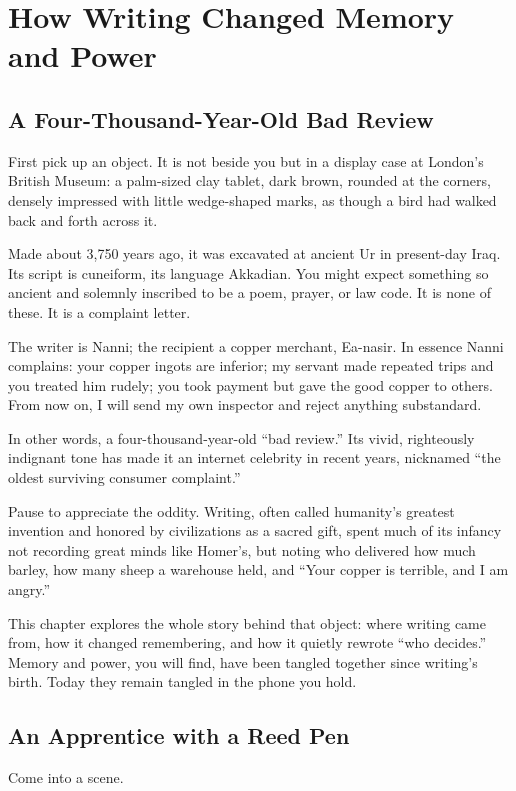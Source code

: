 \chapter[Writing, Memory, and Power]{How Writing Changed Memory and Power}
\section{A Four-Thousand-Year-Old Bad Review}
First pick up an object. It is not beside you but in a display case at London's British Museum: a palm-sized clay tablet, dark brown, rounded at the corners, densely impressed with little wedge-shaped marks, as though a bird had walked back and forth across it.

Made about 3,750 years ago, it was excavated at ancient Ur in present-day Iraq. Its script is cuneiform, its language Akkadian. You might expect something so ancient and solemnly inscribed to be a poem, prayer, or law code. It is none of these. It is a complaint letter.

The writer is Nanni; the recipient a copper merchant, Ea-nasir. In essence Nanni complains: your copper ingots are inferior; my servant made repeated trips and you treated him rudely; you took payment but gave the good copper to others. From now on, I will send my own inspector and reject anything substandard.

In other words, a four-thousand-year-old ``bad review.'' Its vivid, righteously indignant tone has made it an internet celebrity in recent years, nicknamed ``the oldest surviving consumer complaint.''

Pause to appreciate the oddity. Writing, often called humanity's greatest invention and honored by civilizations as a sacred gift, spent much of its infancy not recording great minds like Homer's, but noting who delivered how much barley, how many sheep a warehouse held, and ``Your copper is terrible, and I am angry.''

This chapter explores the whole story behind that object: where writing came from, how it changed remembering, and how it quietly rewrote ``who decides.'' Memory and power, you will find, have been tangled together since writing's birth. Today they remain tangled in the phone you hold.

\section{An Apprentice with a Reed Pen}
Come into a scene.

